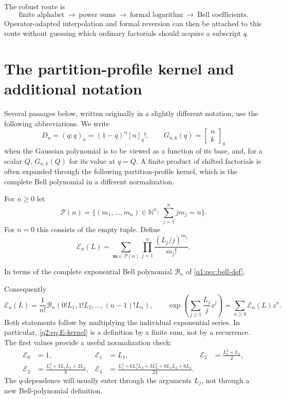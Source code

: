 \documentclass[11pt,a4paper,oneside,openany]{book}
\theoremstyle{definition}
\theoremstyle{remark}
\newcommand{\N}{\mathbb N}
\newcommand{\GB}[3][q]{\begin{bmatrix}#2\\#3\end{bmatrix}_{#1}}
\newcommand{\Y}[1]{\mathcal B_{#1}}
\newcommand{\Ecal}{\mathcal E}
\newcommand{\Pcal}{\mathcal P}
\begin{document}
\begin{masterbox}
The robust route is
\[
 \text{finite alphabet}\ \longrightarrow\ \text{power sums}
 \ \longrightarrow\ \text{formal logarithm}
 \ \longrightarrow\ \text{Bell coefficients}.
\]
Operator-adapted interpolation and formal reversion can then be attached to this
route without guessing which ordinary factorials should acquire a subscript \(q\).
\end{masterbox}

\section{The partition-profile kernel and additional notation}
\label{q2:sec:kernel}
Several passages below, written originally in a slightly different
notation, use the following abbreviations. We write
\[
 D_n=(q;q)_n=(1-q)^n[n]_q!,\qquad
 G_{n,k}(q)=\GB nk
\]
when the Gaussian polynomial is to be viewed as a function of its base, and,
for a scalar \(Q\), \(G_{n,k}(Q)\) for its value at \(q=Q\). A finite
product of shifted factorials is often expanded through the following
partition-profile kernel, which is the complete Bell polynomial in a
different normalization.


For $n\ge0$ let
\[
 \Pcal(n)=\{(m_1,\ldots,m_n)\in\N^n:\ \sum_{j=1}^n jm_j=n\}.
\]
For $n=0$ this consists of the empty tuple. Define
\begin{equation}\label{q2:eq:E-kernel}
 \Ecal_n(L)=\sum_{\bm m\in\Pcal(n)}
       \prod_{j=1}^n\frac{(L_j/j)^{m_j}}{m_j!}.
\end{equation}

In terms of the complete exponential Bell polynomial \(\Y n\) of
\eqref{q1:qcc:bell-def},

Consequently
\begin{equation}\label{q2:eq:E-Bell}
 \Ecal_n(L)=\frac1{n!}\Y n(0!L_1,1!L_2,\ldots,(n-1)!L_n),\qquad
 \exp\left(\sum_{j\ge1}\frac{L_j}jz^j\right)
       =\sum_{n\ge0}\Ecal_n(L)z^n.
\end{equation}
Both statements follow by multiplying the individual exponential series. In
particular, \eqref{q2:eq:E-kernel} is a definition by a finite sum, not by a recurrence.
The first values provide a useful normalization check:
\begin{align}\label{q2:eq:E-small}
 \Ecal_0&=1,&\Ecal_1&=L_1,&
 \Ecal_2&=\frac{L_1^2+L_2}{2},\\
 \Ecal_3&=\frac{L_1^3+3L_1L_2+2L_3}{6},&
 \Ecal_4&=\frac{L_1^4+6L_1^2L_2+3L_2^2+8L_1L_3+6L_4}{24}.
 \nonumber
\end{align}
The $q$-dependence will usually enter through the arguments $L_j$, not through a
new Bell-polynomial definition.
\end{document}
